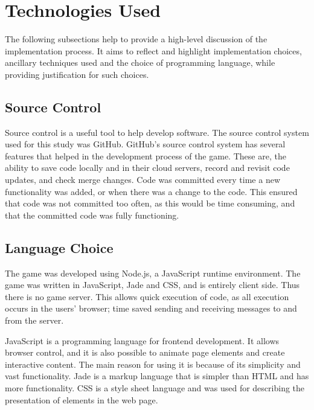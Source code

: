 \documentclass[a4paper,11.5pt]{report}
\numberwithin{figure}{section}
\numberwithin{table}{section}
\numberwithin{equation}{section}
\numberwithin{equation}{section}
\begin{document}


\section{Technologies Used}

The following subsections help to provide a high-level discussion of the implementation process. It aims to reflect and highlight implementation choices, ancillary techniques used and the choice of programming language, while providing justification for such choices.

\subsection{Source Control}

Source control is a useful tool to help develop software. The source control system used for this study was GitHub. GitHub's source control system has several features that helped in the development process of the game. These are, the ability to save code locally and in their cloud servers, record and revisit code updates, and check merge changes. Code was committed every time a new functionality was added, or when there was a change to the code. This ensured that code was not committed too often, as this would be time consuming, and that the committed code was fully functioning.

\subsection{Language Choice}

The game was developed using Node.js, a JavaScript runtime environment. The game was written in JavaScript, Jade and CSS, and is entirely client side. Thus there is no game server. This allows quick execution of code, as all execution occurs in the users' browser; time saved sending and receiving messages to and from the server.

JavaScript is a programming language for frontend development. It allows browser control, and it is also possible to animate page elements and create interactive content. The main reason for using it is because of its simplicity and vast functionality. Jade is a markup language that is simpler than HTML and has more functionality. CSS is a style sheet language and was used for describing the presentation of elements in the web page.
\end{document}
